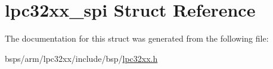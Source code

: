\hypertarget{structlpc32xx__spi}{}\section{lpc32xx\+\_\+spi Struct Reference}
\label{structlpc32xx__spi}


The documentation for this struct was generated from the following file\+:\begin{DoxyCompactItemize}
\item 
bsps/arm/lpc32xx/include/bsp/\mbox{\hyperlink{lpc32xx_8h}{lpc32xx.\+h}}\end{DoxyCompactItemize}
